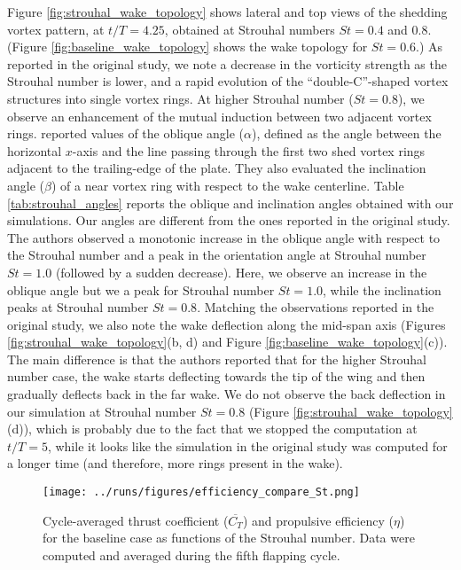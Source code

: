Figure \ref{fig:strouhal_wake_topology} shows lateral and top views of the shedding vortex pattern, at $t/T = 4.25$, obtained at Strouhal numbers $St = 0.4$ and $0.8$.
(Figure \ref{fig:baseline_wake_topology} shows the wake topology for $St = 0.6$.)
As reported in the original study, we note a decrease in the vorticity strength as the Strouhal number is lower, and a rapid evolution of the ``double-C''-shaped vortex structures into single vortex rings.
At higher Strouhal number ($St = 0.8$), we observe an enhancement of the mutual induction between two adjacent vortex rings.
\citet{li_dong_2016} reported values of the oblique angle ($\alpha$), defined as the angle between the horizontal $x$-axis and the line passing through the first two shed vortex rings adjacent to the trailing-edge of the plate.
They also evaluated the inclination angle ($\beta$) of a near vortex ring with respect to the wake centerline.
Table \ref{tab:strouhal_angles} reports the oblique and inclination angles obtained with our simulations.
Our angles are different from the ones reported in the original study.
The authors observed a monotonic increase in the oblique angle with respect to the Strouhal number and a peak in the orientation angle at Strouhal number $St = 1.0$ (followed by a sudden decrease).
Here, we observe an increase in the oblique angle but we a peak for Strouhal number $St = 1.0$, while the inclination peaks at Strouhal number $St = 0.8$.
Matching the observations reported in the original study, we also note the wake deflection along the mid-span axis (Figures \ref{fig:strouhal_wake_topology}(b, d) and Figure \ref{fig:baseline_wake_topology}(c)).
The main difference is that the authors reported that for the higher Strouhal number case, the wake starts deflecting towards the tip of the wing and then gradually deflects back in the far wake.
We do not observe the back deflection in our simulation at Strouhal number $St = 0.8$ (Figure \ref{fig:strouhal_wake_topology}(d)), which is probably due to the fact that we stopped the computation at $t/T = 5$, while it looks like the simulation in the original study was computed for a longer time (and therefore, more rings present in the wake).

\begin{figure}
  \centering
  \texttt{[image: ../runs/figures/efficiency\_compare\_St.png]}
  \caption{Cycle-averaged thrust coefficient ($\overline{C_T}$) and propulsive efficiency ($\eta$) for the baseline case as functions of the Strouhal number. Data were computed and averaged during the fifth flapping cycle.}
  \label{fig:strouhal_propulsive_efficiency}
\end{figure}

